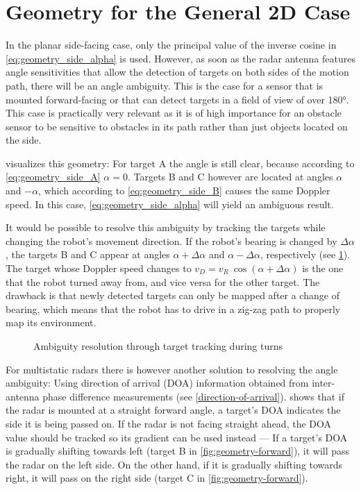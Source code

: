 \section{Geometry for the General 2D Case}\label{geometry-for-the-general-case}

In the planar side-facing case, only the principal value of the inverse cosine in \cref{eq:geometry_side_alpha} is used. However, as soon as the radar antenna features angle sensitivities that allow the detection of targets on both sides of the motion path, there will be an angle ambiguity. This is the case for a sensor that is mounted forward-facing or that can detect targets in a field of view of over 180°. This case is practically very relevant as it is of high importance for an obstacle sensor to be sensitive to obstacles in its path rather than just objects located on the side.

 visualizes this geometry: For target A the angle is still clear, because according to \cref{eq:geometry_side_A} $\alpha = 0$. Targets B and C however are located at angles $\alpha$ and $-\alpha$, which according to \cref{eq:geometry_side_B} causes the same Doppler speed. In this case, \cref{eq:geometry_side_alpha} will yield an ambiguous result.

It would be possible to resolve this ambiguity by tracking the targets while changing the robot's movement direction. If the robot's bearing is changed by $\Delta\alpha$, the targets B and C appear at angles $\alpha+\Delta\alpha$ and $\alpha-\Delta\alpha$, respectively (see \cref{fig:geometry-turn}). The target whose Doppler speed changes to $v_D = v_R~\cos(\alpha+\Delta\alpha)$ is the one that the robot turned away from, and vice versa for the other target. The drawback is that newly detected targets can only be mapped after a change of bearing, which means that the robot has to drive in a zig-zag path to properly map its environment.

\begin{figure}
    \centering
    \def\svgwidth{0.5\linewidth}
    
    \caption{Ambiguity resolution through target tracking during turns}
    \label{fig:geometry-turn}
\end{figure}

For multistatic radars there is however another solution to resolving the angle ambiguity: Using direction of arrival (DOA) information obtained from inter-antenna phase difference measurements (see \cref{direction-of-arrival}).  shows that if the radar is mounted at a straight forward angle, a target's DOA indicates the side it is being passed on. If the radar is not facing straight ahead, the DOA value should be tracked so its gradient can be used instead --- If a target's DOA is gradually shifting towards left (target B in \cref{fig:geometry-forward}), it will pass the radar on the left side. On the other hand, if it is gradually shifting towards right, it will pass on the right side (target C in \cref{fig:geometry-forward}).

